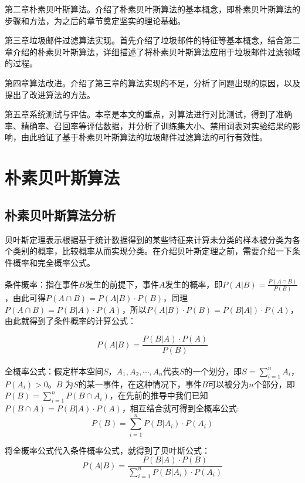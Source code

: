 \documentclass[UTF8,zihao=-4]{ctexart}
\newcommand{\upcite}[1]{\textsuperscript{\cite{#1}}}
\begin{document}
	第二章朴素贝叶斯算法。介绍了朴素贝叶斯算法的基本概念，即朴素贝叶斯算法的步骤和方法，为之后的章节奠定坚实的理论基础。
	
	第三章垃圾邮件过滤算法实现。首先介绍了垃圾邮件的特征等基本概念，结合第二章介绍的朴素贝叶斯算法，详细描述了将朴素贝叶斯算法应用于垃圾邮件过滤领域的过程。
	
	第四章算法改进。介绍了第三章的算法实现的不足，分析了问题出现的原因，以及提出了改进算法的方法。
	
	第五章系统测试与评估。本章是本文的重点，对算法进行对比测试，得到了准确率、精确率、召回率等评估数据，并分析了训练集大小、禁用词表对实验结果的影响，由此验证了基于朴素贝叶斯算法的垃圾邮件过滤算法的可行有效性。

\newpage
\section{朴素贝叶斯算法}
\subsection{朴素贝叶斯算法分析}
	贝叶斯定理表示根据基于统计数据得到的某些特征来计算未分类的样本被分类为各个类别的概率，比较概率从而实现分类。在介绍贝叶斯定理之前，需要介绍一下条件概率和完全概率公式。
	
	条件概率：指在事件$B$发生的前提下，事件$A$发生的概率\upcite{bayes}，即$P(A|B)=\frac{P(A\cap B)}{P(B)}$，由此可得$P(A \cap B)=P(A|B) \cdot P(B)$，同理$P(A \cap B) = P(B|A) \cdot P(A)$，所以$P(A|B) \cdot P(B)=P(B|A|) \cdot P(A)$，由此就得到了条件概率的计算公式：
	
	\begin{equation}
	\label{equ:cond-prob}
	P(A|B)=\frac{P(B|A) \cdot P(A)}{P(B)}
	\end{equation}
	
	全概率公式\upcite{bayes}：假定样本空间$S$，$A_1,A_2,\cdots,A_n$代表$S$的一个划分，即$S=\sum\limits_{i=1}^{n}A_i$，$P(A_i)>0$。$B$ 为$S$的某一事件，在这种情况下，事件$B$可以被分为$n$个部分，即$P(B)=\sum\limits_{i=1}^{n}P(B\cap A_i)$，在先前的推导中我们已知$P(B \cap A)=P(B|A) \cdot P(A)$，相互结合就可得到全概率公式:
	\begin{equation}
	\label{equ:full-prob}
	P(B)=\sum\limits_{i=1}^{n}P(B|A_i) \cdot P(A_i)
	\end{equation}

	
	将全概率公式代入条件概率公式，就得到了贝叶斯公式：
	\begin{equation}
	\label{equ:bayes}
	P(A|B) = \frac{P(B|A) \cdot P(B)}{\sum\limits_{i=1}^{n}P(B|A_i) \cdot P(A_i)}
	\end{equation}
	
\end{document}
